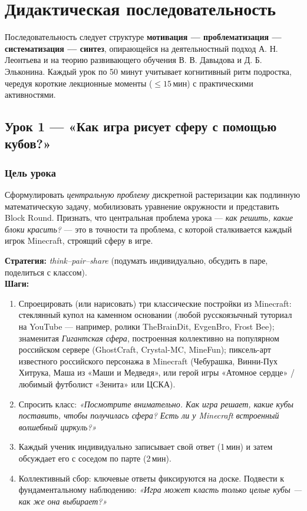 \documentclass[12pt,a4paper]{scrartcl}
\newcommand{\acc}[1]{\textcolor{accent}{\textbf{#1}}}
\newcommand{\tempo}[1]{\textnormal{\footnotesize\color{bg!90!white}\textsf{#1}}}
\begin{document}
\section{Дидактическая последовательность}\label{sec:sequencia}

Последовательность следует структуре \acc{мотивация --- проблематизация --- систематизация --- синтез}, опирающейся на деятельностный подход А. Н. Леонтьева и на теорию развивающего обучения В. В. Давыдова и Д. Б. Эльконина. Каждый урок по 50 минут учитывает когнитивный ритм подростка, чередуя короткие лекционные моменты ($\leq 15$\,мин) с практическими активностями.

\subsection{Урок 1 --- «Как игра рисует сферу с помощью кубов?»}\label{aula1}

\subsubsection*{Цель урока}
Сформулировать \emph{центральную проблему} дискретной растеризации как подлинную математическую задачу, мобилизовать уравнение окружности и представить Block Round. Признать, что центральная проблема урока --- \emph{как решить, какие блоки красить?} --- это в точности та проблема, с которой сталкивается каждый игрок Minecraft, строящий сферу в игре.

\begin{zadanie}[1.1 --- Мотивация \quad\tempo{10 мин}]
\textbf{Стратегия:} \emph{think--pair--share} (подумать индивидуально, обсудить в паре, поделиться с классом). \\[0.4em]
\textbf{Шаги:}
\begin{enumerate}[leftmargin=1.5em,itemsep=0.2em,topsep=0.3em,nosep]
  \item Спроецировать (или нарисовать) три классические постройки из Minecraft: стеклянный купол на каменном основании (любой русскоязычный туториал на YouTube --- например, ролики TheBrainDit, EvgenBro, Frost Bee); знаменитая \emph{Гигантская сфера}, построенная коллективно на популярном российском сервере (GhostCraft, Crystal-MC, MineFun); пиксель-арт известного российского персонажа в Minecraft (Чебурашка, Винни-Пух Хитрука, Маша из «Маши и Медведя», или герой игры «Атомное сердце» / любимый футболист «Зенита» или ЦСКА).
  \item Спросить класс: \emph{«Посмотрите внимательно. Как игра решает, какие кубы поставить, чтобы получилась сфера? Есть ли у Minecraft встроенный волшебный циркуль?»}
  \item Каждый ученик индивидуально записывает свой ответ (1\,мин) и затем обсуждает его с соседом по парте (2\,мин).
  \item Коллективный сбор: ключевые ответы фиксируются на доске. Подвести к фундаментальному наблюдению: \emph{«Игра может класть только целые кубы --- как же она выбирает?»}
\end{enumerate}
\end{zadanie}
\end{document}
